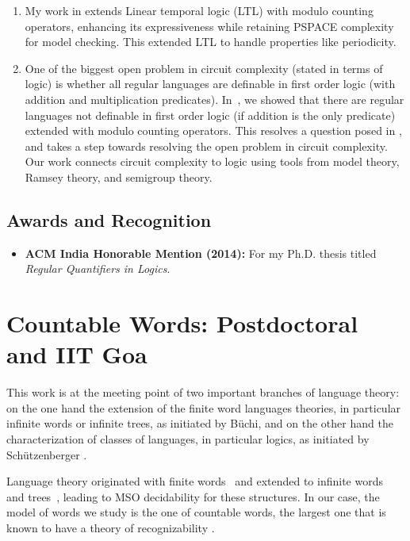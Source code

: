 \documentclass[11pt]{article}
\begin{document}
\begin{enumerate}
 \item My work in \cite{my_ltlmod,my_ltlsuccinct} extends Linear temporal logic (\textsf{LTL}) with modulo counting operators, enhancing its expressiveness while retaining PSPACE complexity for model checking. This extended \textsf{LTL} to handle properties like periodicity.
 \item One of the biggest open problem in circuit complexity (stated in terms of logic) is whether all regular languages are definable in first order logic (with addition and multiplication predicates).
 In~\cite{my_foplus}, we showed that there are regular languages not definable in first order logic (if addition is the only predicate) extended with modulo counting operators. This resolves a question posed in \cite{roy_defGenFO}, and takes a step towards resolving the open problem in circuit complexity. Our work connects circuit complexity to logic using tools from model theory, Ramsey theory, and semigroup theory.
\end{enumerate}

\subsection{Awards and Recognition}
\begin{itemize}
    \item \textbf{ACM India Honorable Mention (2014):} For my Ph.D. thesis titled \emph{Regular Quantifiers in Logics}.
\end{itemize}

\section{Countable Words: Postdoctoral and IIT Goa}
This work is at the meeting point of two important branches of language theory: on the one hand the extension of the finite word languages theories, in particular infinite words or infinite trees, as initiated by Büchi, and on the other hand the characterization of classes of languages, in particular logics, as initiated by Schützenberger \cite{Schutzenberger65}.

Language theory originated with finite words~\cite{Kleene56,RabinScott59} and extended to infinite words~\cite{Buchi62} and trees~\cite{Rabin69}, leading to MSO decidability for these structures.
In our case, the model of words we study is the one of countable words, the largest one that is known to have a theory of recognizability \cite{CartonColcombetPuppis}.
\end{document}
